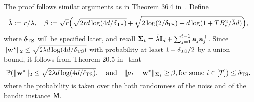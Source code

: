 The proof follows similar arguments as in  Theorem 36.4 in~\cite{lattimore2020bandit}. Define $$\tilde\lambda:={r}/\lambda,~~~\beta:=\sqrt{{r}}\Big(\sqrt{2{r} d\log(4d/{\delta_{{\mathrm{TS}}}})}+\sqrt{2\log(2/{\delta_{{\mathrm{TS}}}})+d\log(1+TB_a^2/\tilde\lambda d)}\Big),
$$
where ${\delta_{{\mathrm{TS}}}}$ will be specified later,  and recall ${{\mathbf\Sigma}}_t=\tilde\lambda {\mathbf I}_d+\sum_{j=1}^{t-1}{\mathbf a}_j{\mathbf a}_j^\top$. Since $\|{\mathbf w}^\star\|_2\leq\sqrt{2\lambda d\log(4d/{\delta_{{\mathrm{TS}}}})}$ with probability at least $1-{\delta_{{\mathrm{TS}}}}/2$ by a union bound, it  follows from Theorem 20.5 in~\cite{lattimore2020bandit} that  $$\mathbb{P}(\|{\mathbf w}^\star\|_2\leq\sqrt{2\lambda d\log(4d/{\delta_{{\mathrm{TS}}}})},~~~\text{and~~~}\|{{\mathbf\mu}}_t-{\mathbf w}^*\|_{{{\mathbf\Sigma}}_t}\geq\beta,\text{for some } i\in[T])\leq{\delta_{{\mathrm{TS}}}},$$ where the probability is taken over the both randomness of the noise and of the bandit instance ${\mathsf{M}}$.  

